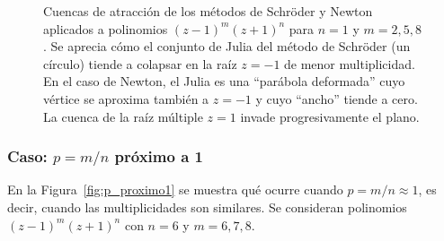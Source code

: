 \begin{figure}[H]
\caption{Cuencas de atracción de los métodos de Schröder y Newton aplicados a polinomios $(z-1)^m(z+1)^n$ para $n=1$ y $m=2, 5, 8$. Se aprecia cómo el conjunto de Julia del método de Schröder (un círculo) tiende a colapsar en la raíz $z=-1$ de menor multiplicidad. En el caso de Newton, el Julia es una ``parábola deformada'' cuyo vértice se aproxima también a $z=-1$ y cuyo ``ancho'' tiende a cero. La cuenca de la raíz múltiple $z=1$ invade progresivamente el plano.}
\label{fig:p_creciente}
\end{figure}

\subsubsection{Caso: $p=m/n$ próximo a 1}

En la Figura~\ref{fig:p_proximo1} se muestra qué ocurre cuando $p=m/n\approx 1$, es decir, cuando las multiplicidades son similares. Se consideran polinomios $(z-1)^m(z+1)^n$ con $n=6$ y $m=6, 7, 8$.

